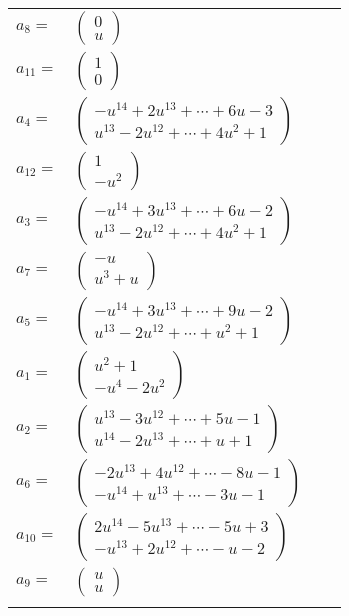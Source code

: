 \documentclass[1p]{elsarticle_modified}
\theoremstyle{definition}
\begin{document}
\begin{tabular}{m{7pt} m{180pt} m{7pt} m{180pt} }
\flushright $a_{8}=$&$\begin{pmatrix}0\\u\end{pmatrix}$ \\
\flushright $a_{11}=$&$\begin{pmatrix}1\\0\end{pmatrix}$ \\
\flushright $a_{4}=$&$\begin{pmatrix}- u^{14}+2 u^{13}+\cdots+6 u-3\\u^{13}-2 u^{12}+\cdots+4 u^2+1\end{pmatrix}$ \\
\flushright $a_{12}=$&$\begin{pmatrix}1\\- u^2\end{pmatrix}$ \\
\flushright $a_{3}=$&$\begin{pmatrix}- u^{14}+3 u^{13}+\cdots+6 u-2\\u^{13}-2 u^{12}+\cdots+4 u^2+1\end{pmatrix}$ \\
\flushright $a_{7}=$&$\begin{pmatrix}- u\\u^3+u\end{pmatrix}$ \\
\flushright $a_{5}=$&$\begin{pmatrix}- u^{14}+3 u^{13}+\cdots+9 u-2\\u^{13}-2 u^{12}+\cdots+u^2+1\end{pmatrix}$ \\
\flushright $a_{1}=$&$\begin{pmatrix}u^2+1\\- u^4-2 u^2\end{pmatrix}$ \\
\flushright $a_{2}=$&$\begin{pmatrix}u^{13}-3 u^{12}+\cdots+5 u-1\\u^{14}-2 u^{13}+\cdots+u+1\end{pmatrix}$ \\
\flushright $a_{6}=$&$\begin{pmatrix}-2 u^{13}+4 u^{12}+\cdots-8 u-1\\- u^{14}+u^{13}+\cdots-3 u-1\end{pmatrix}$ \\
\flushright $a_{10}=$&$\begin{pmatrix}2 u^{14}-5 u^{13}+\cdots-5 u+3\\- u^{13}+2 u^{12}+\cdots- u-2\end{pmatrix}$ \\
\flushright $a_{9}=$&$\begin{pmatrix}u\\u\end{pmatrix}$\\&\end{tabular}
\end{document}

